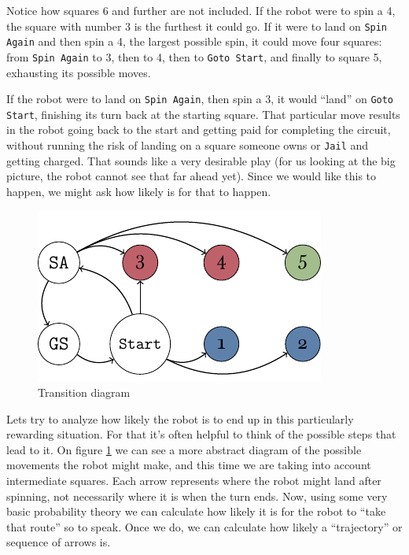 Notice how squares 6 and further are not included. If the robot 
were to spin a 4, the square with number 3 is the furthest it 
could go. If it were to land on \texttt{Spin Again} and then 
spin a 4, the largest possible spin, it could move four 
squares: from \texttt{Spin Again} to 3, then to 4, then to 
\texttt{Goto Start}, and finally to square 5, exhausting its 
possible moves.

If the robot were to land on \texttt{Spin Again}, then spin a 
3, it would ``land'' on \texttt{Goto Start}, finishing its turn 
back at the starting square. That particular move results in 
the robot going back to the start and getting paid for 
completing the circuit, without running the risk of landing on 
a square someone owns or \texttt{Jail} and getting charged. 
That sounds like a very desirable play (for us looking at the 
big picture, the robot cannot see that far ahead yet). Since we 
would like this to happen, we might ask how likely is for that 
to happen.

\begin{figure}[h]
	\centering
	\includegraphics[width=\textwidth]{img/transicion.pdf}
	\caption{Transition diagram}
	\label{fig:miniopoly-transicion}
\end{figure}

Lets try to analyze how likely the robot is to end up in this 
particularly rewarding situation. For that it's often helpful 
to think of the possible steps that lead to it. On figure 
\ref{fig:miniopoly-transicion} we can see a more abstract 
diagram of the possible movements the robot might make, and 
this time we are taking into account intermediate squares. Each 
arrow represents where the robot might land after spinning, not 
necessarily where it is when the turn ends. Now, using some 
very basic probability theory we can calculate how likely it is 
for the robot to ``take that route'' so to speak. Once we do, 
we can calculate how likely a ``trajectory'' or sequence of 
arrows is.

